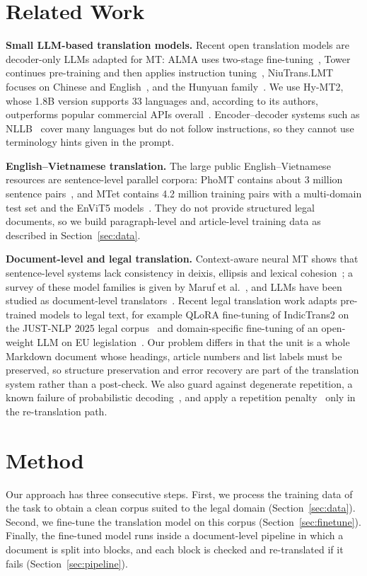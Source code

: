 \documentclass[conference]{IEEEtran}
\begin{document}
\section{Related Work}
\textbf{Small LLM-based translation models.} Recent open translation models are decoder-only LLMs adapted for MT: ALMA uses two-stage fine-tuning~\cite{xu2024alma}, Tower continues pre-training and then applies instruction tuning~\cite{alves2024tower}, NiuTrans.LMT focuses on Chinese and English~\cite{luo2025lmt}, and the Hunyuan family~\cite{zheng2025hunyuanmt}. We use Hy-MT2, whose 1.8B version supports 33 languages and, according to its authors, outperforms popular commercial APIs overall~\cite{zheng2026hymt2}. Encoder--decoder systems such as NLLB~\cite{nllb2022} cover many languages but do not follow instructions, so they cannot use terminology hints given in the prompt.

\textbf{English--Vietnamese translation.} The large public English--Vietnamese resources are sentence-level parallel corpora: PhoMT contains about 3 million sentence pairs~\cite{doan2021phomt}, and MTet contains 4.2 million training pairs with a multi-domain test set and the EnViT5 models~\cite{ngo2022mtet}. They do not provide structured legal documents, so we build paragraph-level and article-level training data as described in Section~\ref{sec:data}.

\textbf{Document-level and legal translation.} Context-aware neural MT shows that sentence-level systems lack consistency in deixis, ellipsis and lexical cohesion~\cite{voita2019context}; a survey of these model families is given by Maruf et al.~\cite{maruf2021survey}, and LLMs have been studied as document-level translators~\cite{wang2023docllm}. Recent legal translation work adapts pre-trained models to legal text, for example QLoRA fine-tuning of IndicTrans2 on the JUST-NLP 2025 legal corpus~\cite{singh2025indictrans2} and domain-specific fine-tuning of an open-weight LLM on EU legislation~\cite{lorini2026eu}. Our problem differs in that the unit is a whole Markdown document whose headings, article numbers and list labels must be preserved, so structure preservation and error recovery are part of the translation system rather than a post-check. We also guard against degenerate repetition, a known failure of probabilistic decoding~\cite{holtzman2020degeneration}, and apply a repetition penalty~\cite{keskar2019ctrl} only in the re-translation path.

\section{Method}
Our approach has three consecutive steps. First, we process the training data of the task to obtain a clean corpus suited to the legal domain (Section~\ref{sec:data}). Second, we fine-tune the translation model on this corpus (Section~\ref{sec:finetune}). Finally, the fine-tuned model runs inside a document-level pipeline in which a document is split into blocks, and each block is checked and re-translated if it fails (Section~\ref{sec:pipeline}).
\end{document}
